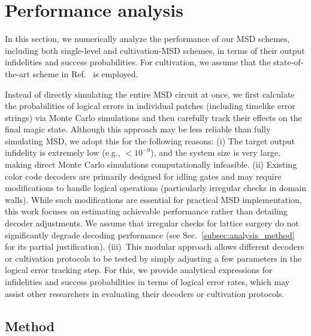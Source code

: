 \documentclass[
 prx,
 reprint,
 superscriptaddress,
 longbibliography,
 dvipsnames
]{revtex4-2}
\begin{document}
\section{Performance analysis \label{sec:performance_analysis}}

\label{para:inthissection}
In this section, we numerically analyze the performance of our MSD schemes, including both single-level and cultivation-MSD schemes, in terms of their output infidelities and success probabilities.
For cultivation, we assume that the state-of-the-art scheme in Ref.~\cite{gidney2024magic} is employed.

\label{para:insteadofdirectly}
Instead of directly simulating the entire MSD circuit at once, we first calculate the probabilities of logical errors in individual patches (including timelike error strings) via Monte Carlo simulations and then carefully track their effects on the final magic state. 
Although this approach may be less reliable than fully simulating MSD, we adopt this for the following reasons:
(i) The target output infidelity is extremely low (e.g.,  $<10^{-9}$), and the system size is very large, making direct Monte Carlo simulations computationally infeasible.
(ii) Existing color code decoders \cite{sarvepalli2012efficient,delfosse2014decoding,maskara2019advantages,chamberland2020triangular,beverland2021cost,delfosse2021almostlinear,sahay2022decoder,sabo2022trellis,kubica2023efficient,zhang2023facilitating,takada2023highly,berent2023decoding, lee2025color} are primarily designed for idling gates and may require modifications to handle logical operations (particularly irregular checks in domain walls).
While such modifications are essential for practical MSD implementation, this work focuses on estimating achievable performance rather than detailing decoder adjustments.
We assume that irregular checks for lattice surgery do not significantly degrade decoding performance (see Sec.~\ref{subsec:analysis_method} for its partial justification).
(iii)~This modular approach allows different decoders or cultivation protocols to be tested by simply adjusting a few parameters in the logical error tracking step.
For this, we provide analytical expressions for infidelities and success probabilities in terms of logical error rates, which may assist other researchers in evaluating their decoders or cultivation protocols.

\subsection{Method \label{subsec:analysis_method}}
\end{document}
